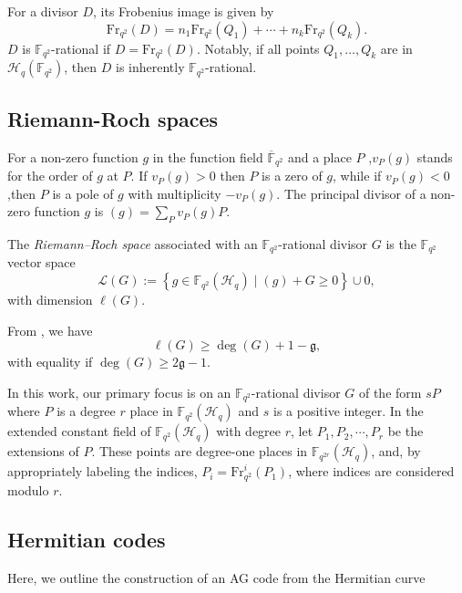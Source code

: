 \documentclass[11pt]{amsart}
\theoremstyle{plain}
\theoremstyle{definition}
\theoremstyle{remark}
\newcommand{\set}[1]{\left\{#1\right\}}
\begin{document}
For a divisor $D$, its Frobenius image is given by
\[
	\text{Fr}_{q^2}(D) = n_1 \text{Fr}_{q^2}(Q_1) + \cdots + n_k \text{Fr}_{q^2}(Q_k).
\]
$D$ is $\mathbb{F}_{q^2}$-rational if $D = \text{Fr}_{q^2}(D)$. Notably, if all points $Q_1, \ldots, Q_k$ are in $\mathscr{H}_q(\mathbb{F}_{q^2})$, then $D$ is inherently $\mathbb{F}_{q^2}$-rational.

\subsection{Riemann-Roch spaces}

For a non-zero function $g$ in the function field $\overline{\mathbb{F}}_{q^2}$ and a place $P$ ,$v_P(g)$ stands for the order of $g$ at $P$. If $v_P(g) > 0$ then $P$ is a zero of $g$, while if $v_P(g) < 0 $,then $P$ is a pole of $g$ with multiplicity  $-v_P(g)$. The principal divisor of a non-zero function $g$ is $(g)= \sum_{P}v_P(g) P$.

The \emph{Riemann--Roch space} associated with an  $\mathbb{F}_{q^2}$-rational divisor $G$ is the $\mathbb{F}_{q^2}$ vector space \[\mathscr{L}(G) := \set{g \in \mathbb{F}_{q^2}(\mathscr{H}_q) \mid (g) + G \geq 0} \cup {0},\] with dimension $\ell(G)$.


From  \cite[Riemann's Theorem~1.4.17]{stichtenoth2009algebraic}, we have \[\ell(G) \geq \deg(G) +1 - \mathfrak{g},\] with equality if $\deg(G) \geq 2\mathfrak{g}-1$.


In this work, our primary focus is on an $\mathbb{F}_{q^2}$-rational divisor $G$ of the form $ sP$ where $P$ is a degree $r$ place in $\mathbb{F}_{q^2}(\mathscr{H}_q)$ and $s$ is a positive integer. In the extended constant field of $\mathbb{F}_{q^2}(\mathscr{H}_q)$ with degree $r$, let $P_1, P_2, \cdots, P_r$ be the extensions of $P$. These points are degree-one places in $\mathbb{F}_{q^{2r}}(\mathscr{H}_q)$, and, by appropriately labeling the indices, $P_{i} = \text{Fr}^i_{q^2}(P_1)$, where indices are considered modulo $r$.




\subsection{Hermitian codes}
Here, we outline the construction of an AG code from the Hermitian curve
\end{document}
